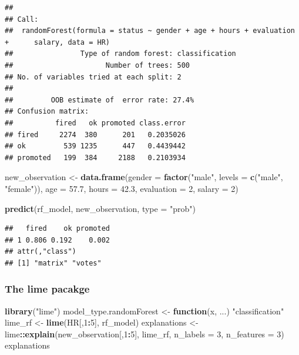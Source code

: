 \documentclass[]{krantz}
\newenvironment{Shaded}{\begin{snugshade}}{\end{snugshade}}
\newcommand{\ControlFlowTok}[1]{\textcolor[rgb]{0.13,0.29,0.53}{\textbf{#1}}}
\newcommand{\DataTypeTok}[1]{\textcolor[rgb]{0.13,0.29,0.53}{#1}}
\newcommand{\DecValTok}[1]{\textcolor[rgb]{0.00,0.00,0.81}{#1}}
\newcommand{\FloatTok}[1]{\textcolor[rgb]{0.00,0.00,0.81}{#1}}
\newcommand{\KeywordTok}[1]{\textcolor[rgb]{0.13,0.29,0.53}{\textbf{#1}}}
\newcommand{\NormalTok}[1]{#1}
\newcommand{\OperatorTok}[1]{\textcolor[rgb]{0.81,0.36,0.00}{\textbf{#1}}}
\newcommand{\StringTok}[1]{\textcolor[rgb]{0.31,0.60,0.02}{#1}}
\theoremstyle{definition}
\theoremstyle{definition}
\theoremstyle{definition}
\theoremstyle{remark}
\begin{document}
\begin{verbatim}
## 
## Call:
##  randomForest(formula = status ~ gender + age + hours + evaluation +      salary, data = HR) 
##                Type of random forest: classification
##                      Number of trees: 500
## No. of variables tried at each split: 2
## 
##         OOB estimate of  error rate: 27.4%
## Confusion matrix:
##          fired   ok promoted class.error
## fired     2274  380      201   0.2035026
## ok         539 1235      447   0.4439442
## promoted   199  384     2188   0.2103934
\end{verbatim}

\begin{Shaded}
\begin{Highlighting}[]
\NormalTok{new_observation <-}\StringTok{ }\KeywordTok{data.frame}\NormalTok{(}\DataTypeTok{gender =} \KeywordTok{factor}\NormalTok{(}\StringTok{"male"}\NormalTok{, }\DataTypeTok{levels =} \KeywordTok{c}\NormalTok{(}\StringTok{"male"}\NormalTok{, }\StringTok{"female"}\NormalTok{)),}
                      \DataTypeTok{age =} \FloatTok{57.7}\NormalTok{,}
                      \DataTypeTok{hours =} \FloatTok{42.3}\NormalTok{,}
                      \DataTypeTok{evaluation =} \DecValTok{2}\NormalTok{,}
                      \DataTypeTok{salary =} \DecValTok{2}\NormalTok{)}

\KeywordTok{predict}\NormalTok{(rf_model, new_observation, }\DataTypeTok{type =} \StringTok{"prob"}\NormalTok{)}
\end{Highlighting}
\end{Shaded}

\begin{verbatim}
##   fired    ok promoted
## 1 0.806 0.192    0.002
## attr(,"class")
## [1] "matrix" "votes"
\end{verbatim}

\hypertarget{the-lime-pacakge}{%
\subsubsection{\texorpdfstring{\textbf{The lime
pacakge}}{The lime pacakge}}\label{the-lime-pacakge}}

\begin{Shaded}
\begin{Highlighting}[]
\KeywordTok{library}\NormalTok{(}\StringTok{"lime"}\NormalTok{)}
\NormalTok{model_type.randomForest <-}\StringTok{ }\ControlFlowTok{function}\NormalTok{(x, ...) }\StringTok{"classification"}
\NormalTok{lime_rf <-}\StringTok{ }\KeywordTok{lime}\NormalTok{(HR[,}\DecValTok{1}\OperatorTok{:}\DecValTok{5}\NormalTok{], rf_model)}
\NormalTok{explanations <-}\StringTok{ }\NormalTok{lime}\OperatorTok{::}\KeywordTok{explain}\NormalTok{(new_observation[,}\DecValTok{1}\OperatorTok{:}\DecValTok{5}\NormalTok{], lime_rf, }\DataTypeTok{n_labels =} \DecValTok{3}\NormalTok{, }\DataTypeTok{n_features =} \DecValTok{3}\NormalTok{)}
\NormalTok{explanations}
\end{Highlighting}
\end{Shaded}
\end{document}

